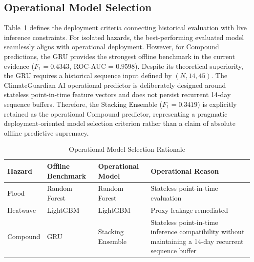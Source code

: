 \subsection{Operational Model Selection}
Table~\ref{tab:op_selection} defines the deployment criteria connecting historical evaluation with live inference constraints. For isolated hazards, the best-performing evaluated model seamlessly aligns with operational deployment. However, for Compound predictions, the GRU provides the strongest offline benchmark in the current evidence ($F_1 = 0.4343$, ROC-AUC = $0.9598$). Despite its theoretical superiority, the GRU requires a historical sequence input defined by $(N, 14, 45)$. The ClimateGuardian AI operational predictor is deliberately designed around stateless point-in-time feature vectors and does not persist recurrent 14-day sequence buffers. Therefore, the Stacking Ensemble ($F_1 = 0.3419$) is explicitly retained as the operational Compound predictor, representing a pragmatic deployment-oriented model selection criterion rather than a claim of absolute offline predictive supremacy.

\begin{table}[htbp]
\caption{Operational Model Selection Rationale}
\begin{center}
\begin{tabular}{p{1.3cm} p{2.2cm} p{1.6cm} p{2.4cm}}
\toprule
\textbf{Hazard} & \textbf{Offline Benchmark} & \textbf{Operational Model} & \textbf{Operational Reason} \\
\midrule
Flood & Random Forest & Random Forest & Stateless point-in-time evaluation \\
Heatwave & LightGBM & LightGBM & Proxy-leakage remediated \\
Compound & GRU & Stacking Ensemble & Stateless point-in-time inference compatibility without maintaining a 14-day recurrent sequence buffer \\
\bottomrule
\end{tabular}
\label{tab:op_selection}
\end{center}
\end{table}

